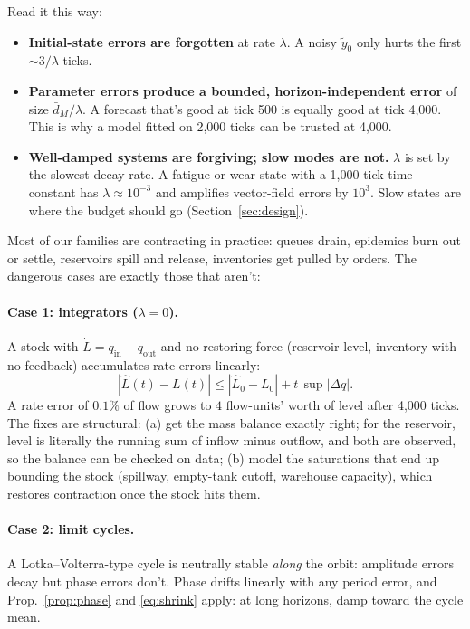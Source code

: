 \documentclass[11pt]{article}
\theoremstyle{plain}
\theoremstyle{definition}
\theoremstyle{remark}
\newcommand{\abs}[1]{\left\lvert #1 \right\rvert}
\begin{document}
\noindent Read it this way:
\begin{itemize}
\item \textbf{Initial-state errors are forgotten} at rate $\lambda$. A noisy $\tilde y_0$ only hurts the first $\sim\!3/\lambda$ ticks.
\item \textbf{Parameter errors produce a bounded, horizon-independent error} of size $\bar d_M/\lambda$. A forecast that's good at tick 500 is equally good at tick 4,000. This is why a model fitted on 2,000 ticks can be trusted at 4,000.
\item \textbf{Well-damped systems are forgiving; slow modes are not.} $\lambda$ is set by the slowest decay rate. A fatigue or wear state with a 1,000-tick time constant has $\lambda\approx10^{-3}$ and amplifies vector-field errors by $10^3$. Slow states are where the budget should go (Section~\ref{sec:design}).
\end{itemize}

Most of our families are contracting in practice: queues drain, epidemics burn out or settle, reservoirs spill and release, inventories get pulled by orders. The dangerous cases are exactly those that aren't:

\paragraph{Case 1: integrators ($\lambda=0$).} A stock with $\dot L=q_{\text{in}}-q_{\text{out}}$ and no restoring force (reservoir level, inventory with no feedback) accumulates rate errors linearly:
\begin{equation}
\abs{\hat L(t)-L(t)}\le\abs{\hat L_0-L_0}+t\,\sup\abs{\Delta q}.
\end{equation}
A rate error of $0.1\%$ of flow grows to $4$ flow-units' worth of level after 4,000 ticks. The fixes are structural: (a) get the mass balance exactly right; for the reservoir, level is literally the running sum of inflow minus outflow, and both are observed, so the balance can be checked on data; (b) model the saturations that end up bounding the stock (spillway, empty-tank cutoff, warehouse capacity), which restores contraction once the stock hits them.

\paragraph{Case 2: limit cycles.} A Lotka--Volterra-type cycle is neutrally stable \emph{along} the orbit: amplitude errors decay but phase errors don't. Phase drifts linearly with any period error, and Prop.~\ref{prop:phase} and \eqref{eq:shrink} apply: at long horizons, damp toward the cycle mean.
\end{document}
